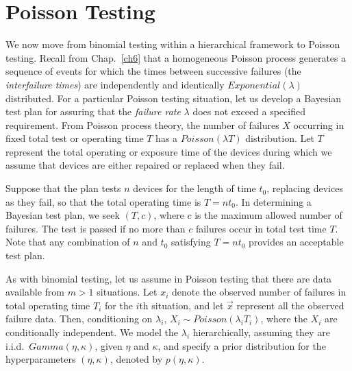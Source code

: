 \documentclass {book}
\begin{document}
\section{Poisson Testing}\label{ch10:sec3} We now move from binomial
testing within a hierarchical framework to Poisson testing. Recall
from Chap.~\ref{ch6} that a homogeneous Poisson
process generates a
sequence of events for which the times between successive failures
(the \emph{interfailure times}) are independently and identically
$Exponential(\lambda)$ distributed. For a particular Poisson
testing situation, let us develop a Bayesian test plan for
assuring that the \emph{failure rate} $\lambda$ does not exceed a
specified requirement. From Poisson process theory, the number of
failures $X$ occurring in fixed total test or operating time $T$
has a $Poisson(\lambda T)$ distribution. Let $T$ represent the
total operating or exposure time of the devices during which we
assume that devices are either repaired or replaced when they
fail.

Suppose that the plan tests $n$ devices for the length of time
$t_{0}$, replacing devices as they fail, so that the total
operating time is $T = nt_{0}$. In determining a Bayesian test
plan, we seek $(T,c)$, where $c$ is the maximum allowed number of
failures. The test is passed if no more than $c$ failures occur in
total test time $T$. Note that any combination of $n$ and $t_{0}$
satisfying $T = nt_{0}$ provides an acceptable test plan.

As with binomial testing, let us assume in Poisson testing that
there are data available from $m > 1$ situations. Let $x_{i}$
denote the observed number of failures in total operating time
$T_{i}$ for the $i$th situation, and let $\vec{x}$ represent all
the observed failure data. Then, conditioning on $\lambda_{i}$,
$X_{i} \sim Poisson(\lambda_{i}T_{i})$, where the $X_{i}$ are
conditionally independent. We model the $\lambda_{i}$
hierarchically, assuming they are i.i.d.\ $Gamma(\eta, \kappa)$,
given $\eta$ and $\kappa$, and specify a prior distribution for
the hyperparameters $(\eta, \kappa)$, denoted by $p(\eta,
\kappa)$.
\end{document}
